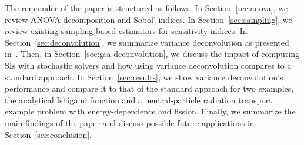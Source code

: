 The remainder of the paper is structured as follows.
In Section~\ref{sec:anova}, we review ANOVA decomposition and Sobol' indices.
In Section~\ref{sec:sampling}, we review existing sampling-based estimators for sensitivity indices.
In Section~\ref{sec:deconvolution}, we summarize variance deconvolution as presented in~\cite{clements-etal-2024}. 
Then, in Section~\ref{sec:gsa-deconvolution}, we discuss the impact of computing SIs with stochastic solvers and how using variance deconvolution compares to a standard approach. 
In Section~\ref{sec:results}, we show variance deconvolution's performance and compare it to that of the standard approach for two examples, the analytical Ishigami function and a neutral-particle radiation transport example problem with energy-dependence and fission.
Finally, we summarize the main findings of the paper and discuss possible future applications in Section~\ref{sec:conclusion}.